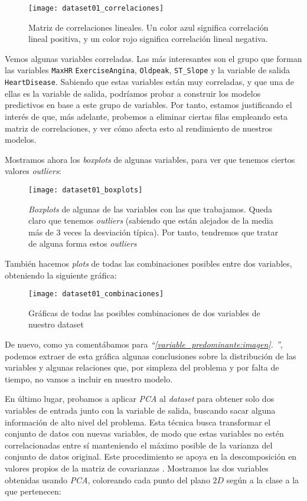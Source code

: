 \documentclass[11pt]{article}
\newcommand{\customcite}[1]{\emph{``\ref{#1}. \nameref{#1}''}}
\begin{document}
\begin{figure}[H]
    \centering
    \texttt{[image: dataset01\_correlaciones]}
    \caption{Matriz de correlaciones lineales. Un color azul significa correlación lineal positiva, y un color rojo significa correlación lineal negativa.}
\end{figure}

Vemos algunas variables correladas. Las más interesantes son el grupo que forman las variables \lstinline{MaxHR} \lstinline{ExerciseAngina}, \lstinline{Oldpeak}, \lstinline{ST_Slope} y la variable de salida \lstinline{HeartDisease}. Sabiendo que estas variables están muy correladas, y que una de ellas es la variable de salida, podríamos probar a construir los modelos predictivos en base a este grupo de variables. Por tanto, estamos justificando el interés de que, más adelante, probemos a eliminar ciertas filas empleando esta matriz de correlaciones, y ver cómo afecta esto al rendimiento de nuestros modelos.

Mostramos ahora los \emph{boxplots} de algunas variables, para ver que tenemos ciertos valores \emph{outliers}:

\begin{figure}[H]
    \centering
    \texttt{[image: dataset01\_boxplots]}
    \caption{\emph{Boxplots} de algunas de las variables con las que trabajamos. Queda claro que tenemos \emph{outliers} (sabiendo que están alejados de la media más de 3 veces la desviación típica). Por tanto, tendremos que tratar de alguna forma estos \emph{outliers}}
\end{figure}

También hacemos \emph{plots} de todas las combinaciones posibles entre dos variables, obteniendo la siguiente gráfica:

\begin{figure}[H]
    \centering
    \texttt{[image: dataset01\_combinaciones]}
    \caption{Gráficas de todas las posibles combinaciones de dos variables de nuestro dataset}
\end{figure}

De nuevo, como ya comentábamos para \customcite{variable_predominante:imagen}, podemos extraer de esta gráfica algunas conclusiones sobre la distribución de las variables y algunas relaciones que, por simpleza del problema y por falta de tiempo, no vamos a incluir en nuestro modelo.

En último lugar, probamos a aplicar \emph{PCA} al \emph{dataset} para obtener solo dos variables de entrada junto con la variable de salida, buscando sacar alguna información de alto nivel del problema. Esta técnica busca transformar el conjunto de datos con nuevas variables, de modo que estas variables no estén correlacionadas entre sí manteniendo el máximo posible de la varianza del conjunto de datos original. Este procedimiento se apoya en la descomposición en valores propios de la matriz de covarianzas \cite{pca:online}. Mostramos las dos variables obtenidas usando \emph{PCA}, coloreando cada punto del plano $2D$ según a la clase a la que pertenecen:
\end{document}
